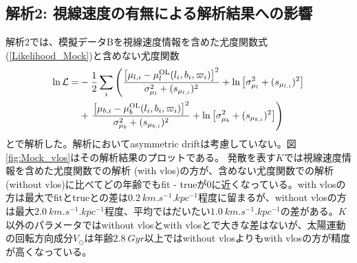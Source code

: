 \subsection{解析2: 視線速度の有無による解析結果への影響}
解析2では、模擬データBを視線速度情報を含めた尤度関数式(\ref{Likelihood_Mock})と含めない尤度関数
\begin{align}
\begin{aligned}
	\ln \mathcal{L} =& -\frac{1}{2}\sum_i \left(\frac{\left[\mu_{l,i} - \mu_l^{\mathrm{OL}}(l_i,b_i,\varpi_i)\right]^2}{\sigma_{\mu_l}^2 + (s_{\mu_{l,i}})^2}  + {\rm ln}\left[\sigma_{\mu_l}^2 + (s_{\mu_{l,i}})^2\right] \right. \\
	&+ \left. \frac{\left[\mu_{b,i} - \mu_b^{\mathrm{OL}}(l_i,b_i,\varpi_i)\right]^2}{\sigma_{\mu_b}^2 + (s_{\mu_{b,i}})^2}  + {\rm ln}\left[\sigma_{\mu_b}^2 + (s_{\mu_{b,i}})^2\right] \right)
\end{aligned}
\end{align}
とで解析した。解析においてasymmetric driftは考慮していない。図\ref{fig:Mock_vlos}はその解析結果のプロットである。 発散を表す$K$では視線速度情報を含めた尤度関数での解析 (with vlos)の方が、含めない尤度関数での解析 (without vlos)に比べてどの年齢でもfit - trueが0に近くなっている。with vlosの方は最大でfitとtrueとの差は$\SI{0.2}{km.s^{-1}.kpc^{-1}}$程度に留まるが、without vlosの方は最大$\SI{2.0}{km.s^{-1}.kpc^{-1}}$程度、平均ではだいたい$\SI{1.0}{km.s^{-1}.kpc^{-1}}$の差がある。$K$以外のパラメータではwithout vlosとwith vlosとで大きな差はないが、太陽運動の回転方向成分$V_{\odot}$は年齢$\SI{2.8}{Gyr}$以上ではwithout vlosよりもwith vlosの方が精度が高くなっている。

